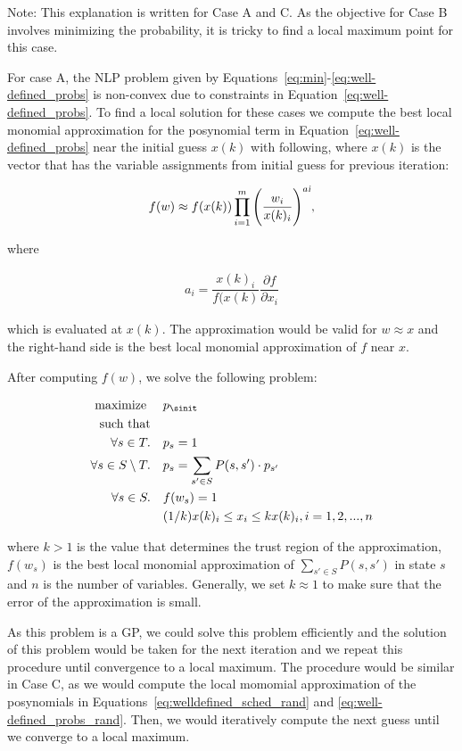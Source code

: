 Note: This explanation is written for Case A and C. As the objective for Case B involves minimizing the probability, it is tricky to find a local maximum point for this case.


For case A, the NLP problem given by Equations~\ref{eq:min}-\ref{eq:well-defined_probs} is non-convex due to constraints in Equation~\ref{eq:well-defined_probs}. To find a local solution for these cases we compute the best local monomial approximation for the posynomial term in Equation~\ref{eq:well-defined_probs} near the initial guess $x(k)$ with following, where $x(k)$ is the vector that has the variable assignments from initial guess for previous iteration:

\begin{align*}
f(w)\approx f(x(k))\prod_{i=1}^{m}\Bigg(\dfrac{w_{i}}{x(k)_{i}}\Bigg)^{a\textsl{i}},
\end{align*}

\noindent where

\begin{align*}
a_{i}=\dfrac{x(k)_{i}}{f(x(k)}\dfrac{\partial f}{\partial x_{i}}
\end{align*}

which is evaluated at $x(k)$. The approximation would be valid for $w \approx x$ and the right-hand side is the best local monomial approximation of $f$ near $x$.

After computing $f(w)$, we solve the following problem:


		\begin{align}
			\text{maximize } &\quad p_{\sinit}\\
			\text{such that}\\
			\forall s\in T.	 &\quad p_s=1\\
			\forall s\in S\setminus T.	&\quad p_s = \sum_{s'\in S}	P(s,s')\cdot p_{s'}\\
			\forall s\in S.	 &\quad f(w_{s})=1\\
			&\quad (1/k)x(k)_{i}\leq x_{i} \leq kx(k)_{i}, i=1,2,...,n
		\end{align}
		
\noindent where $k > 1$ is the value that determines the trust region of the approximation, $f(w_{s})$ is the best local monomial approximation of $\sum_{s'\in S}P(s,s')$ in state $s$ and $n$ is the number of variables. Generally, we set $k \approx 1$ to make sure that the error of the approximation is small.

As this problem is a GP, we could solve this problem efficiently and the solution of this problem would be taken for the next iteration and we repeat this procedure until convergence to a local maximum. The procedure would be similar in Case C, as we would compute the local momomial approximation of the posynomials in Equations~\ref{eq:welldefined_sched_rand} and \ref{eq:well-defined_probs_rand}. Then, we would iteratively compute the next guess until we converge to a local maximum.

